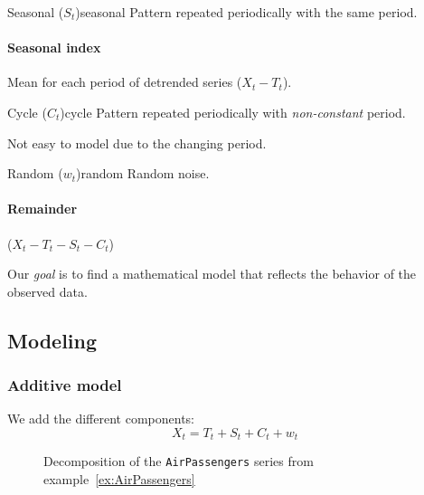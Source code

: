 \begin{definition}{Seasonal ($S_t$)}{seasonal}
	Pattern repeated periodically with the same period.

	\paragraph{Seasonal index} Mean for each period of detrended series ($X_t - T_t$).
\end{definition}

\begin{definition}{Cycle ($C_t$)}{cycle}
	Pattern repeated periodically with \emph{non-constant} period.

	\vspace{1em}
	\begin{marker}
		Not easy to model due to the changing period.
	\end{marker}
\end{definition}

\begin{definition}{Random ($w_t$)}{random}
	Random noise.

	\paragraph{Remainder} ($X_t - T_t - S_t - C_t$)
\end{definition}

Our \emph{goal} is to find a mathematical model that reflects the behavior of the observed
data.

\subsection{Modeling}

\subsubsection{Additive model}
We add the different components:
\begin{equation}
	X_t = T_t + S_t + C_t + w_t \tag{additive}
\end{equation}

\begin{figure}[H]
	\caption{Decomposition of the \texttt{AirPassengers} series from example~\ref{ex:AirPassengers}}
\end{figure}

